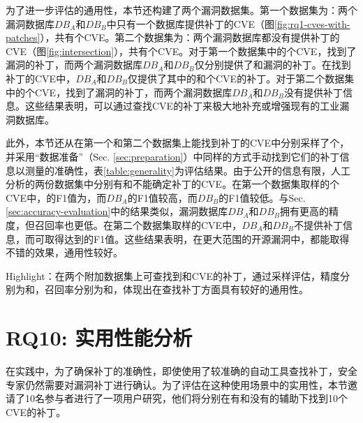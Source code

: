 为了进一步评估\tool 的通用性，本节还构建了两个漏洞数据集。第一个数据集为：两个漏洞数据库$DB_A$和$DB_B$中只有一个数据库提供补丁的CVE（图\ref{fig:rq1-cves-with-patches}），共有个CVE。第二个数据集为：两个漏洞数据库都没有提供补丁的CVE（图\ref{fig:intersection}），共有个CVE。对于第一个数据集中的个CVE，\tool 找到了漏洞的补丁，而两个漏洞数据库$DB_A$和$DB_B$仅分别提供了和漏洞的补丁。在\tool 找到补丁的CVE中，$DB_A$和$DB_B$仅提供了其中的和个CVE的补丁。对于第二个数据集中的个CVE，\tool 找到了漏洞的补丁，而两个漏洞数据库$DB_A$和$DB_B$没有提供补丁信息。这些结果表明，\tool 可以通过查找CVE的补丁来极大地补充或增强现有的工业漏洞数据库。


此外，本节还从\tool 在第一个和第二个数据集上能找到补丁的CVE中分别采样了个，并采用“数据准备”（Sec. \ref{sec:preparation}）中同样的方式手动找到它们的补丁信息以测量\tool 的准确性，表\ref{table:generality}为评估结果。由于公开的信息有限，人工分析的两份数据集中分别有和不能确定补丁的CVE。在第一个数据集取样的个CVE中，\tool 的F1值为，而$DB_A$的F1值较高，而$DB_B$的F1值较低。与Sec. \ref{sec:accuracy-evaluation}中的结果类似，漏洞数据库$DB_A$和$DB_B$拥有更高的精度，但召回率也更低。在第二个数据集取样的CVE中，$DB_A$和$DB_B$不提供补丁信息，而\tool 可取得达到的F1值。这些结果表明，在更大范围的开源漏洞中，\tool 都能取得不错的效果，通用性较好。


\begin{tcolorbox}[size=title,opacityfill=0.15]
Highlight：\tool 在两个附加数据集上可查找到和CVE的补丁，通过采样评估，精度分别为和，召回率分别为和，体现出\tool 在查找补丁方面具有较好的通用性。
\end{tcolorbox}

\section{RQ10: 实用性能分析}\label{sec:usefulness}
在实践中，为了确保补丁的准确性，即使使用了较准确的自动工具查找补丁，安全专家仍然需要对漏洞补丁进行确认。为了评估\tool 在这种使用场景中的实用性，本节邀请了10名参与者进行了一项用户研究，他们将分别在有和没有\tool 的辅助下找到10个CVE的补丁。


